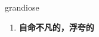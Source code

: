 
\begin{frame}
{\huge grandiose}
\begin{center}
\begin{enumerate}\Large
  \item \textbf{自命不凡的，浮夸的}
\end{enumerate}
\end{center}
\end{frame}

